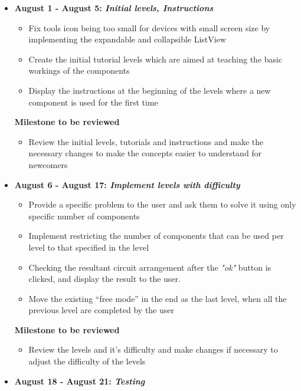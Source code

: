 \documentclass[preprint,12pt]{elsarticle}
\begin{document}
\begin{itemize}

\item \textbf{August 1 - August 5: \textit{Initial levels, Instructions}}

\begin{itemize}
\item Fix tools icon being too small for devices with small screen size by implementing the expandable and collapsible ListView
\item Create the initial tutorial levels which are aimed at teaching the basic workings of the components
\item Display the instructions at the beginning of the levels where a new component is used for the first time
\end{itemize}

\textbf{Milestone to be reviewed}
\begin{itemize}
\item Review the initial levels, tutorials and instructions and make the necessary changes to make the concepts easier to understand for newcomers
\end{itemize}

\item \textbf{August 6 - August 17: \textit{Implement levels with difficulty}}

\begin{itemize}
\item Provide a specific problem to the user and ask them to solve it using only specific number of components
\item Implement restricting the number of components that can be used per level to that specified in the level
\item Checking the resultant circuit arrangement after the \textit{"ok"} button is clicked, and display the result to the user.
\item Move the existing “free mode” in the end as the last level, when all the previous level are completed by the user
\end{itemize}

\textbf{Milestone to be reviewed}
\begin{itemize}
\item Review the levels and it’s difficulty and make changes if necessary to adjust the difficulty of the levels
\end{itemize}

\item \textbf{August 18 - August 21: \textit{Testing}}


\end{itemize}
\end{document}
